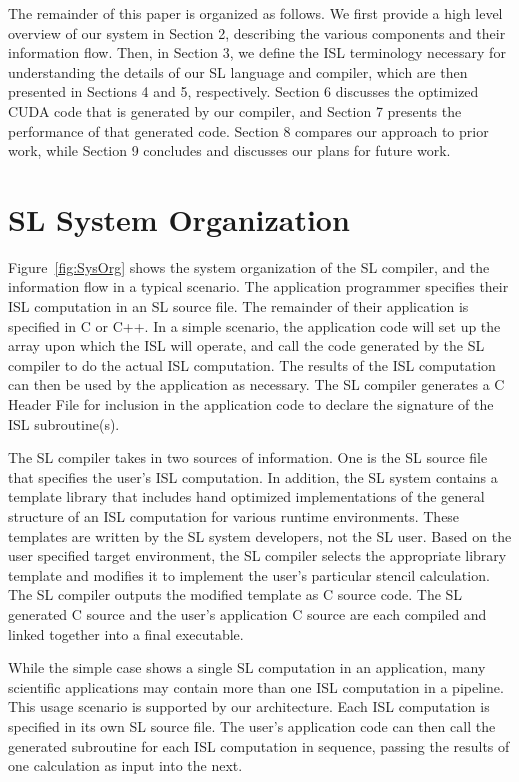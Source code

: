 \documentclass[preprint,nocopyrightspace]{styles/sigplanconf}
\begin{document}
The remainder of this paper is organized as follows.  We first provide a high
level overview of our system in Section 2, describing the various components
and their information flow.  Then, in Section 3, we define the ISL terminology
necessary for understanding the details of our SL language and compiler, which
are then presented in Sections 4 and 5, respectively.  Section 6 discusses the
optimized CUDA code that is generated by our compiler, and Section 7 presents
the performance of that generated code.  Section 8 compares our approach to
prior work, while Section 9 concludes and discusses our plans for future work.

\section{SL System Organization}

Figure~\ref{fig:SysOrg} shows the system organization of the SL compiler,
and the information flow in a typical scenario.  
The application programmer specifies their ISL computation in an SL source
file.  The remainder of their application is specified in C or C++.  
In a simple scenario, the application code will set up the array upon which
the ISL will operate, and call the code generated by the SL compiler to do
the actual ISL computation.  The results of the ISL computation can then be
used by the application as necessary.  The SL compiler generates a C Header File 
for inclusion in the application code to declare the signature of the ISL
subroutine(s).

The SL compiler takes in two sources of information.  One is the SL source file
that specifies the user's ISL computation.  In addition, the SL system 
contains a template library that includes hand optimized implementations of 
the general structure of an ISL computation for various runtime environments.
These templates are written by the SL system developers, not the SL user.
Based on the user specified target environment, the SL compiler selects the
appropriate library template and modifies it to implement the user's particular
stencil calculation.  The SL compiler outputs the modified template as C source code.
The SL generated C source and the user's application C source are each compiled and
linked together into a final executable.

While the simple case shows a single SL computation in an application, many
scientific applications may contain more than one ISL computation in a pipeline.
This usage scenario is supported by our architecture.  Each ISL computation
is specified in its own SL source file.  The user's application code can then
call the generated subroutine for each ISL computation in sequence, passing the results
of one calculation as input into the next.
\end{document}
